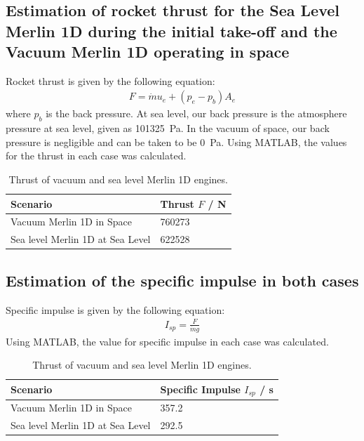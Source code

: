 \documentclass[11pt]{article}
\numberwithin{equation}{section}
\begin{document}
\section{}
\subsection{Estimation of  rocket thrust for the Sea Level Merlin 1D during the initial take-off and the Vacuum Merlin 1D operating in space}
Rocket thrust is given by the following equation:
\begin{gather}
    F = \dot{m} u_e + \left(p_e - p_b\right)A_e
\end{gather}
where $p_b$ is the back pressure. At sea level, our back pressure is the atmosphere pressure at sea level, given as \SI{101325}{\pascal}. In the vacuum of space, our back pressure is negligible and can be taken to be \SI{0}{\pascal}. Using MATLAB, the values for the thrust in each case was calculated.

\begin{table}[H]
    \centering
    \begin{tabular}{@{}l l@{}}
        \toprule
        Scenario                         & {Thrust $F$ / \si{\newton}} \\
        \midrule
        Vacuum Merlin 1D in Space        & 760273                      \\
        Sea level Merlin 1D at Sea Level & 622528                      \\
        \bottomrule
    \end{tabular}
    \caption{Thrust of vacuum and sea level Merlin 1D engines.}
\end{table}
\subsection{Estimation of the specific impulse in both cases}
Specific impulse is given by the following equation:
\begin{gather}
    I_{sp} = \frac{F}{\dot{m}g}
\end{gather}
Using MATLAB, the value for specific impulse in each case was calculated.

\begin{table}[H]
    \centering
    \begin{tabular}{@{}l l@{}}
        \toprule
        Scenario                         & {Specific Impulse $I_{sp}$ / \si{\second}} \\
        \midrule
        Vacuum Merlin 1D in Space        & 357.2                                      \\
        Sea level Merlin 1D at Sea Level & 292.5                                      \\
        \bottomrule
    \end{tabular}
    \caption{Thrust of vacuum and sea level Merlin 1D engines.}
\end{table}
\end{document}
